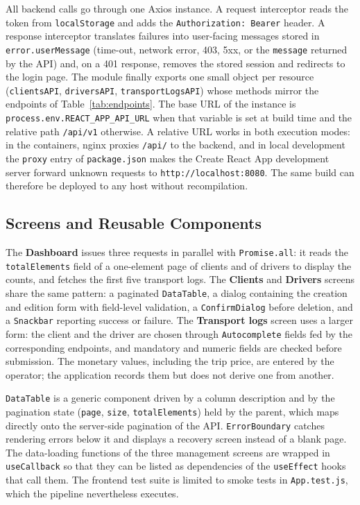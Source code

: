 All backend calls go through one Axios instance. A request interceptor reads the token from \texttt{localStorage} and adds the \texttt{Authorization: Bearer} header. A response interceptor translates failures into user-facing messages stored in \texttt{error.userMessage} (time-out, network error, 403, 5xx, or the \texttt{message} returned by the API) and, on a 401 response, removes the stored session and redirects to the login page. The module finally exports one small object per resource (\texttt{clientsAPI}, \texttt{driversAPI}, \texttt{transportLogsAPI}) whose methods mirror the endpoints of Table~\ref{tab:endpoints}. The base URL of the instance is \texttt{process.env.REACT\_APP\_API\_URL} when that variable is set at build time and the relative path \texttt{/api/v1} otherwise. A relative URL works in both execution modes: in the containers, nginx proxies \texttt{/api/} to the backend, and in local development the \texttt{proxy} entry of \texttt{package.json} makes the Create React App development server forward unknown requests to \texttt{http://localhost:8080}. The same build can therefore be deployed to any host without recompilation.


\subsection{Screens and Reusable Components}

The \textbf{Dashboard} issues three requests in parallel with \texttt{Promise.all}: it reads the \texttt{totalElements} field of a one-element page of clients and of drivers to display the counts, and fetches the first five transport logs. The \textbf{Clients} and \textbf{Drivers} screens share the same pattern: a paginated \texttt{DataTable}, a dialog containing the creation and edition form with field-level validation, a \texttt{ConfirmDialog} before deletion, and a \texttt{Snackbar} reporting success or failure. The \textbf{Transport logs} screen uses a larger form: the client and the driver are chosen through \texttt{Autocomplete} fields fed by the corresponding endpoints, and mandatory and numeric fields are checked before submission. The monetary values, including the trip price, are entered by the operator; the application records them but does not derive one from another.

\texttt{DataTable} is a generic component driven by a column description and by the pagination state (\texttt{page}, \texttt{size}, \texttt{totalElements}) held by the parent, which maps directly onto the server-side pagination of the API. \texttt{ErrorBoundary} catches rendering errors below it and displays a recovery screen instead of a blank page. The data-loading functions of the three management screens are wrapped in \texttt{useCallback} so that they can be listed as dependencies of the \texttt{useEffect} hooks that call them. The frontend test suite is limited to smoke tests in \texttt{App.test.js}, which the pipeline nevertheless executes.

